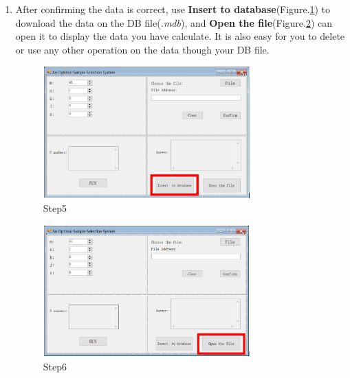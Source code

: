 \begin{enumerate}
\item After confirming the data is correct, use \textbf{Insert to database}(Figure.\ref{fig:st5}) 
to download the data on the DB file(\emph{\*.mdb}), and \textbf{Open the file}(Figure.\ref{fig:st6}) can open it to display the data you have calculate. 
It is also easy for you to delete or use any other operation on the data though your DB file.
\begin{figure}[!htbp]
	\centering
	\includegraphics[width=0.75\textwidth]{images/step5.png}
	\caption{Step5}
	\label{fig:st5}
\end{figure}
\begin{figure}[!htbp]
	\centering
	\includegraphics[width=0.75\textwidth]{images/step6.png}
	\caption{Step6}
	\label{fig:st6}
\end{figure}

\end{enumerate}